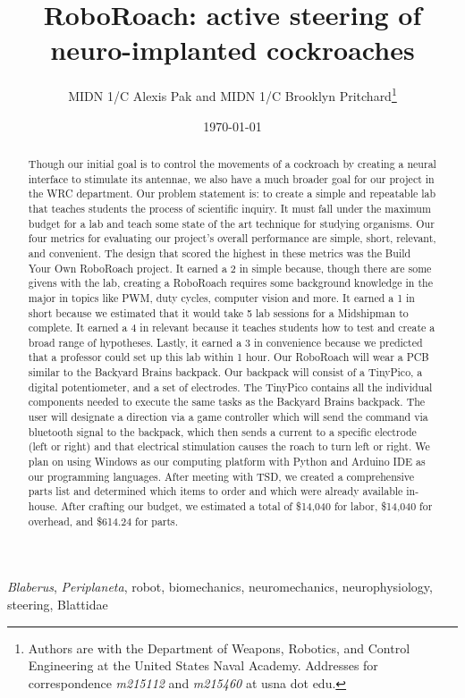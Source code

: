 \documentclass[twocolumn,10pt]{IEEEtran}
\title{RoboRoach: active steering of neuro-implanted cockroaches}
\author{MIDN 1/C Alexis Pak and MIDN 1/C Brooklyn Pritchard\thanks{Authors are with the Department of Weapons, Robotics, and Control Engineering at the United States Naval Academy. Addresses for correspondence \emph{m215112} and \emph{m215460} at usna dot edu.}}
\date{\today}
\newcommand{\Blaberus}{\emph{Blaberus}}
\newcommand{\Periplaneta}{\emph{Periplaneta}}
\begin{document}
\maketitlepage
\maketitle

\begin{abstract}
Though our initial goal is to control the movements of a cockroach by creating a neural interface to stimulate its antennae, we also have a much broader goal for our project in the WRC department. Our problem statement is: to create a simple and repeatable lab that teaches students the process of scientific inquiry. It must fall under the maximum budget for a lab and teach some state of the art technique for studying organisms. Our four metrics for evaluating our project’s overall performance are simple, short, relevant, and convenient. The design that scored the highest in these metrics was the Build Your Own RoboRoach project. It earned a 2 in simple because, though there are some givens with the lab, creating a RoboRoach requires some background knowledge in the major in topics like PWM, duty cycles, computer vision and more. It earned a 1 in short because we estimated that it would take 5 lab sessions for a Midshipman to complete. It earned a 4 in relevant because it teaches students how to test and create a broad range of hypotheses. Lastly, it earned a 3 in convenience because we predicted that a professor could set up this lab within 1 hour.  Our RoboRoach will wear a PCB similar to the Backyard Brains backpack. Our backpack will consist of a TinyPico, a digital potentiometer, and a set of electrodes. The TinyPico contains all the individual components needed to execute the same tasks as the Backyard Brains backpack. The user will designate a direction via a game controller which will send the command via bluetooth signal to the backpack, which then sends a current to a specific electrode (left or right) and that electrical stimulation causes the roach to turn left or right. We plan on using Windows as our computing platform with Python and Arduino IDE as our programming languages. After meeting with TSD, we created a comprehensive parts list and determined which items to order and which were already available in-house. After crafting our budget, we estimated a total of \$14,040 for labor, \$14,040 for overhead, and \$614.24 for parts. 
\end{abstract}

\begin{IEEEkeywords}
\Blaberus, \Periplaneta, robot, biomechanics, neuromechanics, neurophysiology, steering, Blattidae
\end{IEEEkeywords}
\end{document}
